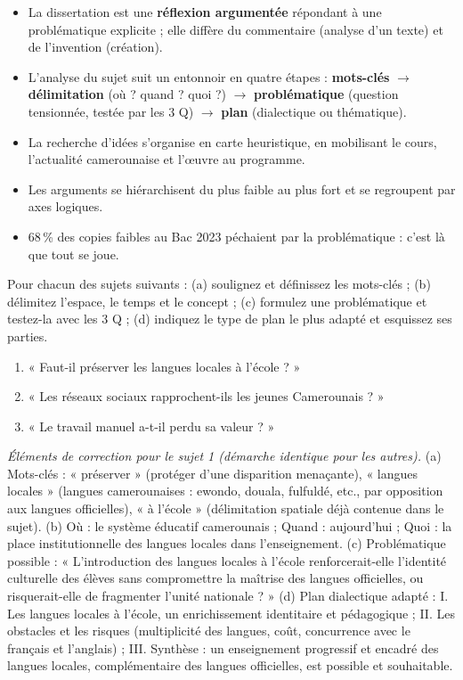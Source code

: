 \documentclass[11pt]{article}
\begin{document}
\begin{aretenir}
\begin{itemize}
\item La dissertation est une \textbf{réflexion argumentée} répondant à une problématique explicite ; elle diffère du commentaire (analyse d'un texte) et de l'invention (création).
\item L'analyse du sujet suit un entonnoir en quatre étapes : \textbf{mots-clés} $\rightarrow$ \textbf{délimitation} (où ? quand ? quoi ?) $\rightarrow$ \textbf{problématique} (question tensionnée, testée par les 3 Q) $\rightarrow$ \textbf{plan} (dialectique ou thématique).
\item La recherche d'idées s'organise en carte heuristique, en mobilisant le cours, l'actualité camerounaise et l'œuvre au programme.
\item Les arguments se hiérarchisent du plus faible au plus fort et se regroupent par axes logiques.
\item 68\,\% des copies faibles au Bac 2023 péchaient par la problématique : c'est là que tout se joue.
\end{itemize}
\end{aretenir}

\begin{exercice}
Pour chacun des sujets suivants : (a) soulignez et définissez les mots-clés ; (b) délimitez l'espace, le temps et le concept ; (c) formulez une problématique et testez-la avec les 3 Q ; (d) indiquez le type de plan le plus adapté et esquissez ses parties.
\begin{enumerate}
\item « Faut-il préserver les langues locales à l'école ? »
\item « Les réseaux sociaux rapprochent-ils les jeunes Camerounais ? »
\item « Le travail manuel a-t-il perdu sa valeur ? »
\end{enumerate}
\end{exercice}

\begin{corrige}[Exercice]
\emph{Éléments de correction pour le sujet 1 (démarche identique pour les autres).} (a) Mots-clés : « préserver » (protéger d'une disparition menaçante), « langues locales » (langues camerounaises : ewondo, douala, fulfuldé, etc., par opposition aux langues officielles), « à l'école » (délimitation spatiale déjà contenue dans le sujet). (b) Où : le système éducatif camerounais ; Quand : aujourd'hui ; Quoi : la place institutionnelle des langues locales dans l'enseignement. (c) Problématique possible : « L'introduction des langues locales à l'école renforcerait-elle l'identité culturelle des élèves sans compromettre la maîtrise des langues officielles, ou risquerait-elle de fragmenter l'unité nationale ? » (d) Plan dialectique adapté : I. Les langues locales à l'école, un enrichissement identitaire et pédagogique ; II. Les obstacles et les risques (multiplicité des langues, coût, concurrence avec le français et l'anglais) ; III. Synthèse : un enseignement progressif et encadré des langues locales, complémentaire des langues officielles, est possible et souhaitable.
\end{corrige}
\end{document}
